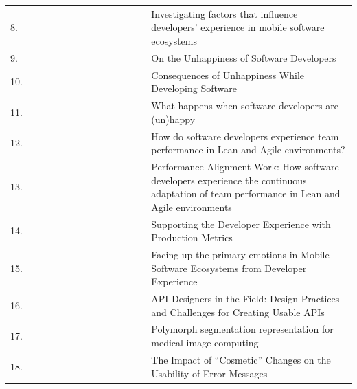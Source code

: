\documentclass[english, 12pt, a4paper, sci, utf8, a-1b, online]{aaltothesis}
\begin{document}
\begin{center}
\begin{longtable}{p{0.05\linewidth}p{0.35\linewidth}p{0.6\linewidth}}
    8.  & \textcite{fontao2017investigating}                    & Investigating factors that influence developers' experience in mobile software ecosystems                                                   \\
    9.  & \textcite{on-the-unhappiness}                         & On the Unhappiness of Software Developers                                                                                                   \\
    10. & \textcite{consequences-of-unhappiness}                & Consequences of Unhappiness While Developing Software                                                                                       \\
    11. & \textcite{what-happens-when-unhappy}                  & What happens when software developers are (un)happy                                                                                         \\
    12. & \textcite{how-developers-experience-team-performance} & How do software developers experience team performance in Lean and Agile environments?                                                      \\
    13. & \textcite{paw}                                        & Performance Alignment Work: How software developers experience the continuous adaptation of team performance in Lean and Agile environments \\
    14. & \textcite{chatley2019supporting}                      & Supporting the Developer Experience with Production Metrics                                                                                 \\
    15. & \textcite{fontao2017facing}                           & Facing up the primary emotions in Mobile Software Ecosystems from Developer Experience                                                      \\
    16. & \textcite{api-designers}                              & API Designers in the Field: Design Practices and Challenges for Creating Usable APIs                                                        \\
    17. & \textcite{pinter2019polymorph}                        & Polymorph segmentation representation for medical image computing                                                                           \\
    18. & \textcite{dong2019impact}                             & The Impact of ``Cosmetic'' Changes on the Usability of Error Messages                                                                         \\

\end{longtable}
\end{center}
\end{document}
